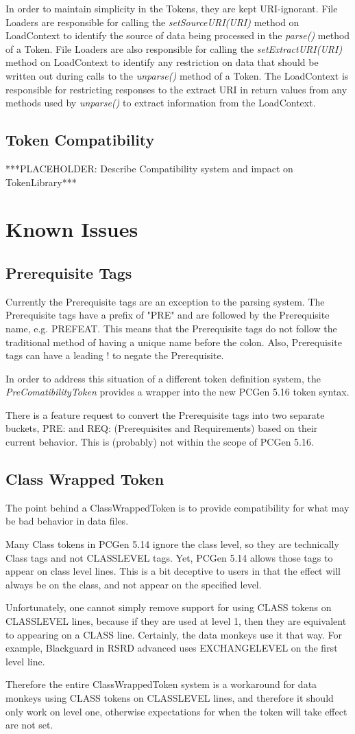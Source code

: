 \documentclass[12pt,letterpaper]{article}
\newcommand{\pcgenversEOS}{5.16}
\newcommand{\pcgenvers}{\pcgenversEOS{} }
\newcommand{\textem}[1]{\emph{#1}}
\newcommand{\nsection}[1]{\newpage \section{#1}}
\newcommand{\lnsection}[1]{\label{#1}\nsection{#1}}
\newcommand{\lsubsection}[1]{\label{#1}\subsection{#1}}
\begin{document}
In order to maintain simplicity in the Tokens, they are kept URI-ignorant.  File Loaders
are responsible for calling the \textem{setSourceURI(URI)} method on LoadContext
to identify the source of data being processed in the \textem{parse()} method of a Token.
File Loaders are also responsible for calling the \textem{setExtractURI(URI)} method
on LoadContext to identify any restriction on data that should be written out
during calls to the \textem{unparse()} method of a Token.  The LoadContext is responsible
for restricting responses to the extract URI in return values from any methods used by
\textem{unparse()} to extract information from the LoadContext.

\lsubsection{Token Compatibility}

***PLACEHOLDER: Describe Compatibility system and impact on TokenLibrary***

\lnsection{Known Issues}

\lsubsection{Prerequisite Tags}

Currently the Prerequisite tags are an exception to the parsing system.  The Prerequisite tags
have a prefix of "PRE" and are followed by the Prerequisite name, e.g. PREFEAT.  This means that 
the Prerequisite tags do not follow the traditional method of having a unique name before 
the colon.  Also, Prerequisite tags can have a leading ! to negate the Prerequisite.

In order to address this situation of a different token definition system, the
\textem{PreComatibilityToken} provides a wrapper into the new PCGen \pcgenvers token syntax. 

There is a feature request to convert the Prerequisite tags into two separate buckets, PRE: and REQ: 
(Prerequisites and Requirements) based on their current behavior.  This is (probably) not within
the scope of PCGen \pcgenversEOS. 

\lsubsection{Class Wrapped Token}

The point behind a ClassWrappedToken is to provide compatibility for what may be bad
behavior in data files.

Many Class tokens in PCGen 5.14 ignore the class level, so they are technically Class tags
and not CLASSLEVEL tags. Yet, PCGen 5.14 allows those tags to
appear on class level lines.  This is a bit deceptive to users in that the effect will always
be on the class, and not appear on the specified level.

Unfortunately, one cannot simply remove support for using CLASS tokens on CLASSLEVEL lines, 
because if they are used at level 1, then they are equivalent to appearing on a CLASS line.  
Certainly, the data monkeys use it that way.  For example, Blackguard in RSRD advanced uses
EXCHANGELEVEL on the first level line.

Therefore the entire ClassWrappedToken system is a workaround for data monkeys using CLASS
tokens on CLASSLEVEL lines, and therefore it should only work on level one, otherwise
expectations for when the token will take effect are not set.

\end{document}
